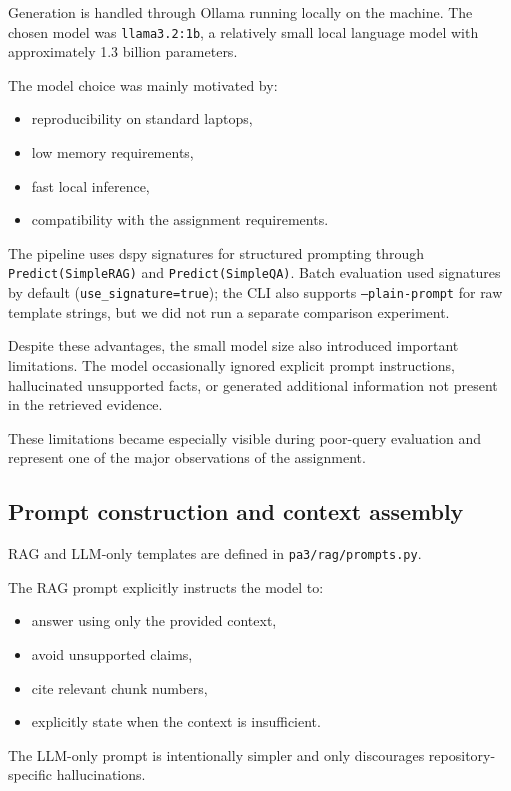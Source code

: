 \documentclass[11pt,a4paper]{article}
\begin{document}
Generation is handled through Ollama running locally on the machine. The chosen model was \texttt{llama3.2:1b}, a relatively small local language model with approximately 1.3 billion parameters.

The model choice was mainly motivated by:

\begin{itemize}
  \item reproducibility on standard laptops,
  \item low memory requirements,
  \item fast local inference,
  \item compatibility with the assignment requirements.
\end{itemize}

The pipeline uses dspy signatures for structured prompting through \texttt{Predict(SimpleRAG)} and \texttt{Predict(SimpleQA)}. Batch evaluation used signatures by default (\texttt{use\_signature=true}); the CLI also supports \texttt{--plain-prompt} for raw template strings, but we did not run a separate comparison experiment.

Despite these advantages, the small model size also introduced important limitations. The model occasionally ignored explicit prompt instructions, hallucinated unsupported facts, or generated additional information not present in the retrieved evidence.

These limitations became especially visible during poor-query evaluation and represent one of the major observations of the assignment.

\subsection{Prompt construction and context assembly}
RAG and LLM-only templates are defined in \texttt{pa3/rag/prompts.py}.

The RAG prompt explicitly instructs the model to:

\begin{itemize}
  \item answer using only the provided context,
  \item avoid unsupported claims,
  \item cite relevant chunk numbers,
  \item explicitly state when the context is insufficient.
\end{itemize}

The LLM-only prompt is intentionally simpler and only discourages repository-specific hallucinations.
\end{document}
